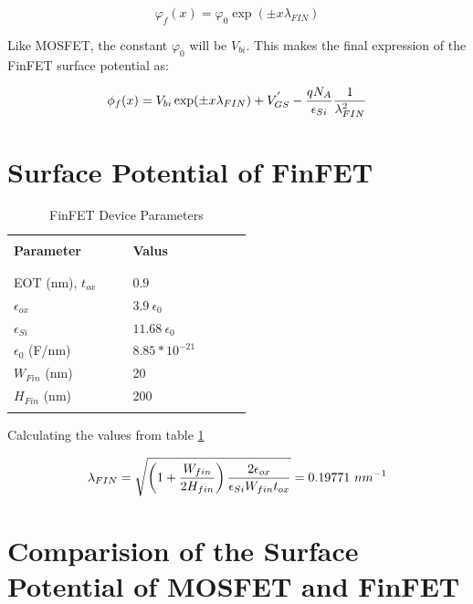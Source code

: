 \documentclass[a4paper]{article}
\begin{document}
\begin{equation}
  \varphi_f(x) = \varphi_0 \exp(\pm x \lambda_{FIN})
\end{equation}

Like MOSFET, the constant $\varphi_0$ will be $V_{bi}$. This makes the final expression of the FinFET surface potential as:

\begin{equation}
  \phi_f(x) = V_{bi} \exp(\pm x \lambda_{FIN}) + V_{GS}^{'} - \frac{qN_A} {\epsilon_{Si}} \frac{1}{\lambda_{FIN}^2}
\end{equation}

\section{Surface Potential of FinFET}

\begin{table}[!h]
  \caption{FinFET Device Parameters}
  \label{tab:Fin-device-table}
  \centering
  \begin{tabular}{p{0.4\linewidth} p{0.4\linewidth} }
    \hline
    \hline
     & \\
    \textbf{Parameter} & \textbf{Valus}\\
     & \\
    \hline
    & \\
    EOT (nm), $t_{ox}$ \cite{web:ITRS} & $0.9$\\
    $\epsilon_{ox}$ & $3.9~\epsilon_0$\\
    $\epsilon_{Si}$ & $11.68~\epsilon_0$\\
    $\epsilon_0$ (F/nm) & $8.85 * 10^{-21}$\\
    $W_{Fin}$ (nm) & 20 \\
    $H_{Fin}$ (nm) & 200\\
    & \\
    \hline
    \hline
  \end{tabular}
\end{table}

Calculating the values from table \ref{tab:Fin-device-table}

\begin{equation}
  \lambda_{FIN} = \sqrt {\left( 1 + \frac{W_{fin}}{2 H_{fin}} \right) \frac{2 \epsilon_{ox}}{\epsilon_{Si}W_{fin} t_{ox}}} = 0.19771~nm^{-1}
\end{equation}

\section{Comparision of the Surface Potential of MOSFET and FinFET}
\end{document}

